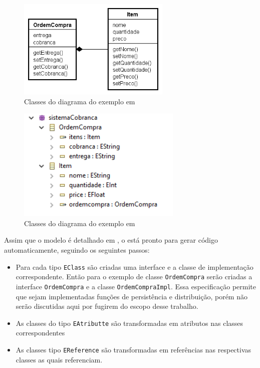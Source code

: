 \begin{figure}[h]
	\centering
	\includegraphics[width=0.65\textwidth]{figuras/exemplos-emf/exemplo-uml.png}
	\caption{Classes do diagrama do exemplo em \uml}
	\label{exemplo-uml}
\end{figure}

\begin{figure}[h]
	\centering
	\includegraphics[width=0.7\textwidth]{figuras/exemplos-emf/exemplo-ecore.PNG}
	\caption{Classes do diagrama do exemplo em \ecore}
	\label{exemplo-ecore}
\end{figure}

Assim que o modelo é detalhado em \ecore, o \emf está pronto para gerar código automaticamente, seguindo os seguintes passos:

\begin{itemize}
	\item Para cada tipo \texttt{EClass} são criadas uma interface e a classe de implementação correspondente. Então para o exemplo de classe \texttt{OrdemCompra} serão criadas a interface \texttt{OrdemCompra} e a classe \texttt{OrdemCompraImpl}. Essa especificação permite que sejam implementadas funções de persistência e distribuição, porém não serão discutidas aqui por fugirem do escopo desse trabalho.
	\item As classes do tipo \texttt{EAtributte} são transformadas em atributos nas classes correspondentes
	\item As classes tipo \texttt{EReference} são transformadas em referências nas respectivas classes as quais referenciam.
\end{itemize}

